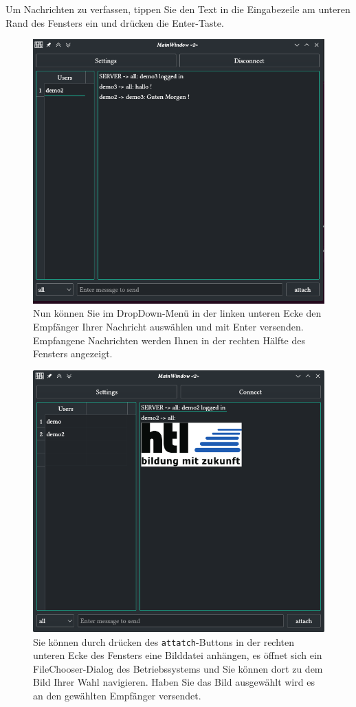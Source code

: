\documentclass[a4paper,ngerman,headsepline]{scrreprt}
\begin{document}
Um Nachrichten zu verfassen, tippen Sie den Text in die Eingabezeile am unteren Rand des Fensters ein und drücken die Enter-Taste.%

\begin{figure}[ht]\centering
\includegraphics[width=\textwidth]{images/conversation}
\caption{Nun können Sie im DropDown-Menü in der linken unteren Ecke den Empfänger Ihrer Nachricht auswählen und mit Enter versenden. Empfangene Nachrichten werden Ihnen in der rechten Hälfte des Fensters angezeigt.\label{fig:conversation}}
\end{figure}


\begin{figure}[ht]\centering
\includegraphics[width=\textwidth]{images/attach-image}
\caption{Sie können durch drücken des \texttt{attatch}-Buttons in der rechten unteren Ecke des Fensters eine Bilddatei anhängen, es öffnet sich ein FileChooser-Dialog des Betriebssystems und Sie können dort zu dem Bild Ihrer Wahl navigieren. Haben Sie das Bild ausgewählt wird es an den gewählten Empfänger versendet.\label{fig:attach-image}}
\end{figure}
\end{document}
